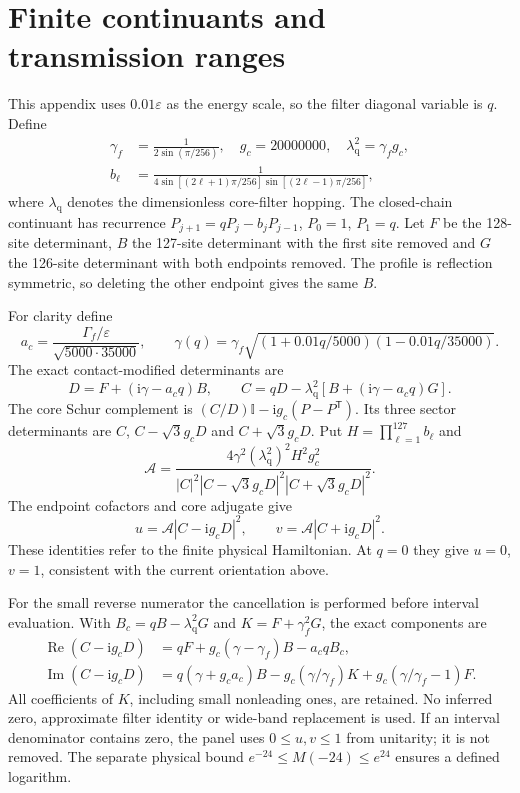\documentclass[11pt,a4paper]{article}
\newcommand{\ee}{\varepsilon}
\newcommand{\ii}{\mathrm i}
\newcommand{\ellambda}{\lambda_{\mathrm q}}
\begin{document}
\section{Finite continuants and transmission ranges}
\label{app:continuants}

This appendix uses $0.01\ee$ as the energy scale, so the filter diagonal
variable is $q$. Define
\begin{align}
 \gamma_f&=\frac1{2\sin(\pi/256)},\quad g_c=20000000,\quad
 \ellambda^2=\gamma_fg_c,\nonumber\\
 b_\ell&=\frac1{4\sin[(2\ell+1)\pi/256]\sin[(2\ell-1)\pi/256]},
 \label{eq:qparams}
\end{align}
where $\ellambda$ denotes the dimensionless core-filter hopping.
The closed-chain continuant has recurrence
$P_{j+1}=qP_j-b_jP_{j-1}$, $P_0=1$, $P_1=q$.
Let $F$ be the 128-site determinant, $B$ the 127-site determinant with
the first site removed and $G$ the 126-site determinant with both endpoints
removed. The profile is reflection symmetric, so deleting the other endpoint
gives the same $B$.

For clarity define
\begin{equation}
 a_c=\frac{\Gamma_f/\ee}{\sqrt{5000\cdot35000}},\qquad
 \gamma(q)=\gamma_f\sqrt{(1+0.01q/5000)(1-0.01q/35000)}.
\end{equation}
The exact contact-modified determinants are
\begin{equation}
 D=F+(\ii\gamma-a_cq)B,\qquad
 C=qD-\ellambda^2[B+(\ii\gamma-a_cq)G].
\end{equation}
The core Schur complement is $(C/D)\mathbb I-\ii g_c(P-P^{\mathsf T})$.
Its three sector determinants are $C$, $C-\sqrt3g_cD$ and
$C+\sqrt3g_cD$. Put $H=\prod_{\ell=1}^{127}b_\ell$ and
\begin{equation}
 \mathcal A=\frac{4\gamma^2(\ellambda^2)^2H^2g_c^2}
 {|C|^2|C-\sqrt3g_cD|^2|C+\sqrt3g_cD|^2}.
\end{equation}
The endpoint cofactors and core adjugate give
\begin{equation}
 u=\mathcal A|C-\ii g_cD|^2,\qquad
 v=\mathcal A|C+\ii g_cD|^2.
 \label{eq:uv}
\end{equation}
These identities refer to the finite physical Hamiltonian. At $q=0$ they
give $u=0$, $v=1$, consistent with the current orientation above.

For the small reverse numerator the cancellation is performed before
interval evaluation. With $B_c=qB-\ellambda^2G$ and
$K=F+\gamma_f^2G$, the exact components are
\begin{align}
 \operatorname{Re}(C-\ii g_cD)
 &=qF+g_c(\gamma-\gamma_f)B-a_cqB_c,\\
 \operatorname{Im}(C-\ii g_cD)
 &=q(\gamma+g_ca_c)B
   -g_c(\gamma/\gamma_f)K+g_c(\gamma/\gamma_f-1)F.
\end{align}
All coefficients of $K$, including small nonleading ones, are retained.
No inferred zero, approximate filter identity or wide-band replacement is
used. If an interval denominator contains zero, the panel uses
$0\le u,v\le1$ from unitarity; it is not removed. The separate physical
bound $e^{-24}\le M(-24)\le e^{24}$ ensures a defined logarithm.
\end{document}
